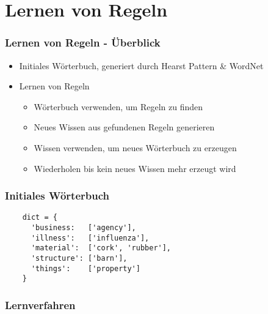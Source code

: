 \section{Lernen von Regeln}
\label{sec:iteratives-lernen}

\begin{frame}
  \frametitle{Lernen von Regeln - Überblick}

  \begin{itemize}
  \item Initiales Wörterbuch, generiert durch Hearst Pattern \& WordNet
  \item Lernen von Regeln
    \begin{itemize}
    \item Wörterbuch verwenden, um Regeln zu finden
    \item Neues Wissen aus gefundenen Regeln generieren
    \item Wissen verwenden, um neues Wörterbuch zu erzeugen
    \item Wiederholen bis kein neues Wissen mehr erzeugt wird
    \end{itemize}
  \end{itemize}
\end{frame}

\begin{frame}[fragile]
  \frametitle{Initiales Wörterbuch}

  \begin{lstlisting}
    dict = {
      'business:   ['agency'],
      'illness':   ['influenza'],
      'material':  ['cork', 'rubber'],
      'structure': ['barn'],
      'things':    ['property']
    }
  \end{lstlisting}
\end{frame}

\begin{frame}[fragile]
  \frametitle{Lernverfahren}

  \centering
\end{frame}

